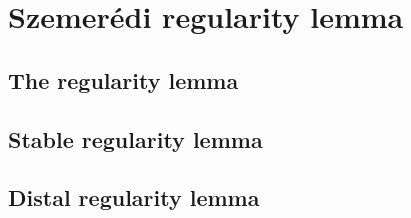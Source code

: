 \documentclass[scombinatorics.tex]{subfiles}
\begin{document}
\chapter{Szemer\'edi regularity lemma}

\label{szemeredi}

\def\medrel#1{\parbox[t]{6ex}{$\displaystyle\hfil #1$}}
\def\ceq#1#2#3{\parbox[t]{25ex}{$\displaystyle #1$}\medrel{#2}{$\displaystyle #3$}}



\section{The regularity lemma}





















\section{Stable regularity lemma}

\section{Distal regularity lemma}
\end{document}
